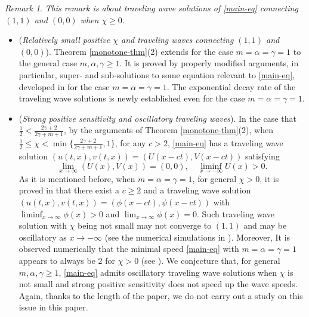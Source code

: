 \documentclass[11pt]{article} %
\theoremstyle{remark}
\newtheorem{remark}{Remark}[section]
\theoremstyle{remark}
\numberwithin{equation}{section}
\numberwithin{figure}{section}
\numberwithin{table}{section}
\begin{document}
\begin{remark}
\label{rk3}
{\it This remark is about traveling wave solutions of \eqref{main-eq} connecting $(1,1)$ and $(0,0)$ when $\chi\ge 0$. }
\begin{itemize}

\item[(1)] ({\it Relatively small positive $\chi$ and traveling waves connecting $(1,1)$ and $(0,0)$}).
Theorem \ref{monotone-thm}(2) extends  \cite[Theorem 1.4]{SaShXu2019} for the case $m=\alpha=\gamma=1$ to the  general case $m,\alpha,\gamma\ge 1$. It is proved  by properly modified arguments, in particular,  super- and sub-solutions to some equation relevant to \eqref{main-eq},    developed in  \cite{SaSh2017-1, SaSh2020, SaShXu2019} for the case $m=\alpha=\gamma=1$.  The exponential decay rate of the traveling wave solutions is newly established even for the case $m=\alpha=\gamma=1$.  



\item[(2)] ({\it Strong positive sensitivity and oscillatory traveling waves}).    In the case that $\frac{1}{2}<\frac{2\gamma+2}{2\gamma+m+1}$,
by the arguments of Theorem \ref{monotone-thm}(2), when $\frac{1}{2}\le \chi<\min\{\frac{2\gamma+2}{2\gamma+m+1},1\}$,  for any $c>2$, \eqref{main-eq} has a traveling wave solution
$(u(t,x),v(t,x))=(U(x-ct),V(x-ct))$ satisfying
$$
\lim_{x\to\infty} (U(x),V(x))=(0,0), \quad \liminf_{x\to -\infty} U(x)>0.
$$
As it is  mentioned before, when $m=\alpha=\gamma=1$,  for 
 general $\chi>0$,   it is proved in  \cite[Theorem 1.2]{HeRe2024} that   there  exist a $c\ge 2$ and  a traveling wave solution $(u(t,x),v(t,x))=(\phi(x-ct),\psi(x-ct))$ with
$\liminf_{x\to \infty}\phi(x)>0$ and $\lim_{x\to\infty}\phi(x)=0$. Such traveling wave solution with $\chi$ being  not small may not converge to $(1,1)$ and may be oscillatory as $x\to -\infty$ (see the numerical simulations in \cite{HeRe2024}).  Moreover,
It is observed numerically that 
 the minimal speed \eqref{main-eq}  with $m=\alpha=\gamma=1$ appears to always be $2$  for $\chi >0$ (see \cite{HeRe2024}). We conjecture that, for general $m,\alpha,\gamma\ge 1$, \eqref{main-eq} admits oscillatory traveling wave solutions when $\chi$ is not small and strong positive sensitivity does not speed up the wave speeds.  Again, thanks to the length of the paper, we do not carry out a study on this issue in this paper.


\end{itemize}

\end{remark}
\end{document}
